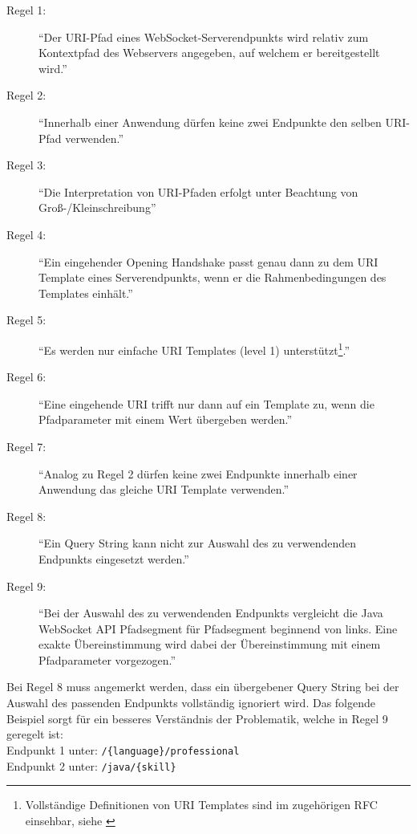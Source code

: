 \documentclass[11pt,a4paper,titlepage]{scrartcl}
\numberwithin{equation}{section}
\begin{document}
\begin{description}
	\item[Regel 1:] \textquotedblleft Der URI-Pfad eines WebSocket-Serverendpunkts wird relativ zum Kontextpfad des Webservers angegeben, auf welchem er bereitgestellt wird.\textquotedblright
	\item[Regel 2:] \textquotedblleft Innerhalb einer Anwendung dürfen keine zwei Endpunkte den selben URI-Pfad verwenden.\textquotedblright
	\item[Regel 3:] \textquotedblleft Die Interpretation von URI-Pfaden erfolgt unter Beachtung von Groß-/Kleinschreibung\textquotedblright
	\item[Regel 4:] \textquotedblleft Ein eingehender Opening Handshake passt genau dann zu dem URI Template eines Serverendpunkts, wenn er die Rahmenbedingungen des Templates einhält.\textquotedblright
	\item[Regel 5:] \textquotedblleft Es werden nur einfache URI Templates (level 1) unterstützt\footnote{Vollständige Definitionen von URI Templates sind im zugehörigen RFC einsehbar, siehe \autocite{nottingham_uri_2012}}.\textquotedblright
	\item[Regel 6:] \textquotedblleft Eine eingehende URI trifft nur dann auf ein Template zu, wenn die Pfadparameter mit einem Wert übergeben werden.\textquotedblright
	\item[Regel 7:] \textquotedblleft Analog zu Regel 2 dürfen keine zwei Endpunkte innerhalb einer Anwendung das gleiche URI Template verwenden.\textquotedblright
	\item[Regel 8:] \textquotedblleft Ein Query String kann nicht zur Auswahl des zu verwendenden Endpunkts eingesetzt werden.\textquotedblright
	\item[Regel 9:] \textquotedblleft Bei der Auswahl des zu verwendenden Endpunkts vergleicht die Java WebSocket API Pfadsegment für Pfadsegment beginnend von links. Eine exakte Übereinstimmung wird dabei der Übereinstimmung mit einem Pfadparameter vorgezogen.\textquotedblright 
\end{description}

\noindent Bei Regel 8 muss angemerkt werden, dass ein übergebener Query String bei der Auswahl des passenden Endpunkts vollständig ignoriert wird. Das folgende Beispiel sorgt für ein besseres Verständnis der Problematik, welche in Regel 9 geregelt ist:\\

\noindent Endpunkt 1 unter: \texttt{/\{language\}/professional}\\
\noindent Endpunkt 2 unter: \texttt{/java/\{skill\}}\\
\end{document}
